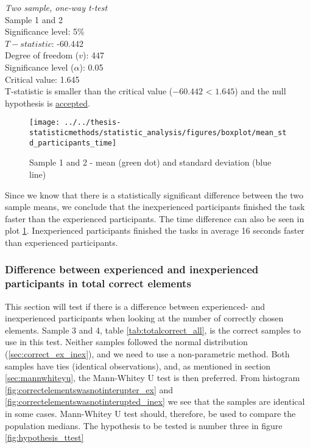 \begin{center}
	\begin{tcolorbox}[width=0.8\textwidth]
		\centering
		\textit{Two sample, one-way t-test}\\
		Sample 1 and 2\\
		Significance level: 5\%  \\[0.5cm]
		
		$T-statistic$: -60.442 \\
		Degree of freedom ($v$): 447 \\ %
		Significance level ($\alpha$): 0.05 \\
		Critical value: 1.645\\[0.2cm]
		
		T-statistic is smaller than the critical value ($-60.442$ < $1.645$) and the null hypothesis is \underline{accepted}.\\[0.5cm]
	\end{tcolorbox} 
\end{center}

\begin{figure}[H]
	\centering
	\texttt{[image: ../../thesis-statisticmethods/statistic\_analysis/figures/boxplot/mean\_std\_participants\_time]}
	\caption{Sample 1 and 2 - mean (green dot) and standard deviation (blue line)}
	\label{fig:meanstdparticipantstime}
\end{figure}

Since we know that there is a statistically significant difference between the two sample means, we conclude that the inexperienced participants finished the task faster than the experienced participants. The time difference can also be seen in plot \ref{fig:meanstdparticipantstime}. Inexperienced participants finished the tasks in average 16 seconds faster than experienced participants.\newline

\subsubsection[Sample 3, 4]{Difference between experienced and inexperienced participants in total correct elements} %

This section will test if there is a difference between experienced- and inexperienced participants when looking at the number of correctly chosen elements. Sample 3 and 4, table \ref{tab:totalcorrect_all}, is the correct samples to use in this test. Neither samples followed the normal distribution (\ref{sec:correct_ex_inex}), and we need to use a non-parametric method. Both samples have ties (identical observations), and, as mentioned in section \ref{sec:mannwhiteyu}, the Mann-Whitey U test is then preferred. From histogram \ref{fig:correctelementswasnotinterupter_ex} and \ref{fig:correctelementswasnotinterupted_inex} we see that the samples are identical in some cases. Mann-Whitey U test should, therefore, be used to compare the population medians. The hypothesis to be tested is number three in figure \ref{fig:hypothesis_ttest}\\[0.3cm]

